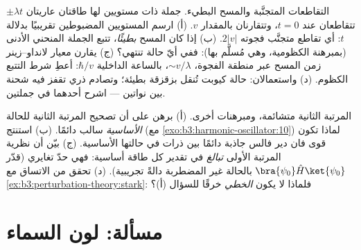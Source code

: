 \begin{exercise}[$\star\star\star$]\label{exo:b3:perturbation-theory:11}
التقاطعات المتجنَّبة والمسح البطيء. جملة ذات مستويين لها طاقتان
عاريتان $\pm\lambda t$ تتقاطعان عند $t = 0$، وتتقارنان بالمقدار $v$. (أ)
ارسم المستويين المضبوطين تقريبيًا بدلالة $t$: أي تقاطع متجنَّب فجوته
$2|v|$. (ب) إذا كان المسح \emph{بطيئًا}، تتبع الجملة
المنحني الأدنى (بمبرهنة الكظومية، وهي مُسلَّم بها): ففي أيّ حالة
تنتهي؟ (ج) يقارن معيار لانداو--زينر زمن المسح
عبر منطقة الفجوة، $\sim v/\lambda$، بالساعة الداخلية
$\hbar/v$: أعطِ شرط التتبع الكظوم. (د) واستعمالان:
حالة كيوبت تُنقل بزقزقة بطيئة؛ وتصادم ذري تقفز فيه شحنة بين
نواتين --- اشرح أحدهما في
جملتين.
\end{exercise}

\begin{exercise}[$\star\star\star$]\label{exo:b3:perturbation-theory:12}
المرتبة الثانية متشائمة، ومبرهنات أخرى. (أ) برهن على أن
تصحيح المرتبة الثانية للحالة \emph{الأساسية} سالب
دائمًا. (ب) استنتج (مع
\cref{exo:b3:harmonic-oscillator:10}) لماذا تكون قوى فان دير فالس
جاذبة دائمًا بين ذرات في حالتها الأساسية. (ج) بيّن أن
نظرية المرتبة الأولى \emph{تبالغ} في تقدير كل طاقة
أساسية: فهي حدّ تغايري (قدّر $\bra{\psi_0}\hat
H\ket{\psi_0}$ بالحالة غير المضطربة دالةً تجريبية). (د)
تحقق من الاتساق مع \cref{ex:b3:perturbation-theory:stark}: فلماذا
لا يكون  \emph{الخطي} خرقًا للسؤال (أ)؟
\end{exercise}

\section{مسألة: لون السماء}

